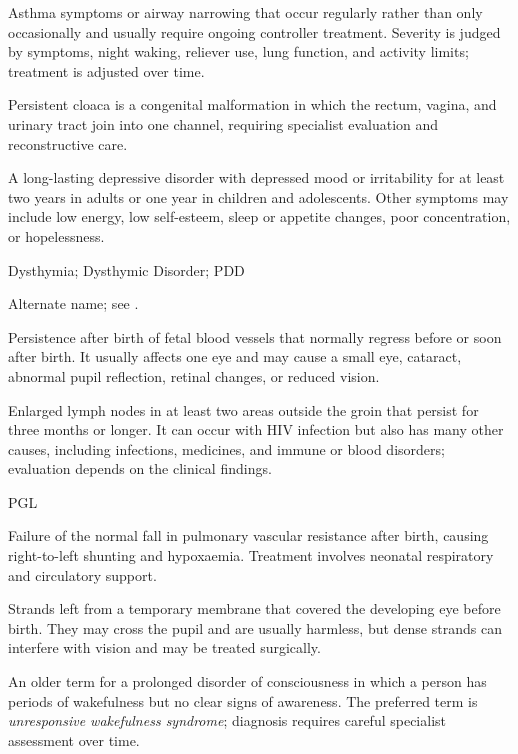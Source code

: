  Asthma symptoms or airway narrowing that occur regularly rather than only occasionally and usually require ongoing controller treatment. Severity is judged by symptoms, night waking, reliever use, lung function, and activity limits; treatment is adjusted over time.

 Persistent cloaca is a congenital malformation in which the rectum, vagina, and urinary tract join into one channel, requiring specialist evaluation and reconstructive care.

 A long-lasting depressive disorder with depressed mood or irritability for at least two years in adults or one year in children and adolescents. Other symptoms may include low energy, low self-esteem, sleep or appetite changes, poor concentration, or hopelessness.

\synonyms
Dysthymia; Dysthymic Disorder; PDD

 Alternate name; see .

 Persistence after birth of fetal blood vessels that normally regress before or soon after birth. It usually affects one eye and may cause a small eye, cataract, abnormal pupil reflection, retinal changes, or reduced vision.

 Enlarged lymph nodes in at least two areas outside the groin that persist for three months or longer. It can occur with HIV infection but also has many other causes, including infections, medicines, and immune or blood disorders; evaluation depends on the clinical findings.

\synonyms
PGL

 Failure of the normal fall in pulmonary vascular resistance after birth, causing right-to-left shunting and hypoxaemia. Treatment involves neonatal respiratory and circulatory support.

 Strands left from a temporary membrane that covered the developing eye before birth. They may cross the pupil and are usually harmless, but dense strands can interfere with vision and may be treated surgically.

 An older term for a prolonged disorder of consciousness in which a person has periods of wakefulness but no clear signs of awareness. The preferred term is \textit{unresponsive wakefulness syndrome}; diagnosis requires careful specialist assessment over time.

